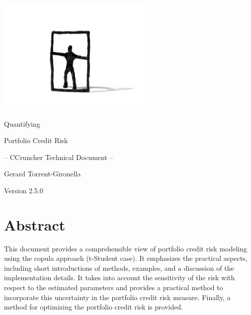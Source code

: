 \documentclass[11pt,fleqn]{book} %
\def\numversion{2.5.0}
\begin{document}
\begingroup
\thispagestyle{empty}
\vspace*{-2.5cm}
\centerline{\includegraphics[angle=0]{./Pictures/logo.png}}
\centering
\vspace*{0.0cm}
\par\normalfont\fontsize{35}{55}\sffamily\selectfont
Quantifying\par 
Portfolio Credit Risk
\vspace*{1.0cm}
\par\normalfont\fontsize{20}{35}\sffamily\selectfont
-- CCruncher Technical Document --\par
\vspace*{2.0cm}
{\huge Gerard Torrent-Gironella}\par
\vspace*{2.0cm}
\par\normalfont\fontsize{18}{18}\sffamily\selectfont
Version \numversion\par
\endgroup


\newpage

\section*{Abstract}
This document provides a comprehensible view of portfolio credit risk modeling 
using the copula approach (t-Student case). It emphasizes the practical aspects, 
including short introductions of methods, examples, and a discussion of the 
implementation details.
It takes into account the sensitivity of the risk with respect to the estimated 
parameters and provides a practical method to incorporate this uncertainty in 
the portfolio credit risk measure. Finally, a method for optimizing the 
portfolio credit risk is provided.
\end{document}
